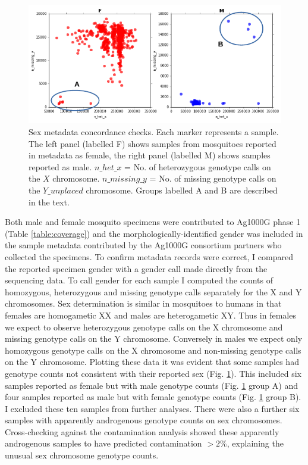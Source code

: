 \documentclass[a4paper,11pt,abstracton,hidelinks]{scrartcl}
\begin{document}
\begin{figure}[t!]
\centering
\includegraphics[width=\textwidth]{artwork/chapter3/sex.pdf}
\caption{Sex metadata concordance checks.
%
Each marker represents a sample.
%
The left panel (labelled F) shows samples from mosquitoes reported in metadata as female, the right panel (labelled M) shows samples reported as male.
%
$n\_het\_x$ = No. of heterozygous genotype calls on the $X$ chromosome.
%
$n\_missing\_y$ = No. of missing genotype calls on the $Y\_unplaced$ chromosome.
%
Groups labelled A and B are described in the text.
%
}
%
\label{fig:sex}
\end{figure}


Both male and female mosquito specimens were contributed to Ag1000G phase 1 (Table \ref{table:coverage}) and the morphologically-identified gender was included in the sample metadata contributed by the Ag1000G consortium partners who collected the specimens.
%
To confirm metadata records were correct, I compared the reported specimen gender with a gender call made directly from the sequencing data.
%
To call gender for each sample I computed the counts of homozygous, heterozygous and missing genotype calls separately for the X and Y chromosomes. 
%
Sex determination is similar in mosquitoes to humans in that females are homogametic XX and males are heterogametic XY.
%
Thus in females we expect to observe heterozygous genotype calls on the X chromosome and missing genotype calls on the Y chromosome.
%
Conversely in males we expect only homozygous genotype calls on the X chromosome and non-missing genotype calls on the Y chromosome.
%
Plotting these data it was evident that some samples had genotype counts not consistent with their reported sex (Fig. \ref{fig:sex}).
%
This included six samples reported as female but with male genotype counts (Fig. \ref{fig:sex} group A) and four samples reported as male but with female genotype counts (Fig. \ref{fig:sex} group B).
%
I excluded these ten samples from further analyses.
%
There were also a further six samples with apparently androgenous genotype counts on sex chromosomes.
%
Cross-checking against the contamination analysis showed these apparently androgenous samples to have predicted contamination $>2\%$, explaining the unusual sex chromosome genotype counts.
\end{document}
